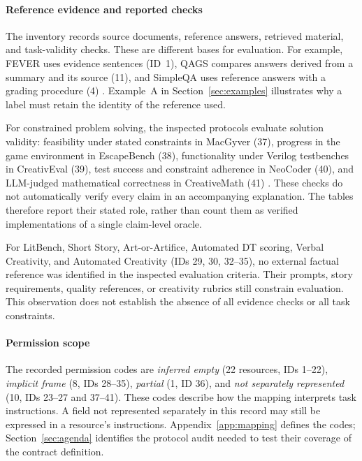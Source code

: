 \documentclass{clv2025}
\begin{document}
\paragraph{Reference evidence and reported checks}
The inventory records source documents, reference answers, retrieved
material, and task-validity checks. These are different bases for evaluation.
For example, FEVER uses evidence sentences (ID~1), QAGS compares answers
derived from a summary and its source (11), and SimpleQA uses reference
answers with a grading procedure (4)
\citep{thorne_fever_2018,wang_asking_2020,wei_measuring_2024}.
Example~A in Section~\ref{sec:examples} illustrates why a label must retain the
identity of the reference used.

For constrained problem solving, the inspected protocols evaluate solution
validity: feasibility under stated constraints in MacGyver (37), progress
in the game environment in EscapeBench (38), functionality under Verilog
testbenches in CreativEval (39), test success and constraint adherence in
NeoCoder (40), and LLM-judged mathematical correctness in CreativeMath (41)
\citep{tian_macgyver_2025,qian_escapebench_2025,delorenzo_creativeval_2024,
lu_benchmarking_2025,ye_assessing_2025}. These checks do not automatically
verify every claim in an accompanying explanation. The tables therefore
report their stated role, rather than count them as verified implementations
of a single claim-level oracle.

For LitBench, Short Story, Art-or-Artifice, Automated DT scoring, Verbal
Creativity, and Automated Creativity (IDs 29, 30, 32--35), no external
factual reference was identified in the inspected evaluation criteria.
Their prompts, story requirements, quality references, or creativity
rubrics still constrain evaluation. This observation does not establish
the absence of all evidence checks or all task constraints.

\paragraph{Permission scope}
The recorded permission codes are \emph{inferred empty} (22 resources,
IDs 1--22), \emph{implicit frame} (8, IDs 28--35), \emph{partial} (1, ID 36),
and \emph{not separately represented} (10, IDs 23--27 and 37--41).
These codes describe how the mapping interprets task instructions. A field
not represented separately in this record may still be expressed in a
resource's instructions. Appendix~\ref{app:mapping} defines the codes;
Section~\ref{sec:agenda} identifies the protocol audit needed to test their
coverage of the contract definition.
\end{document}
